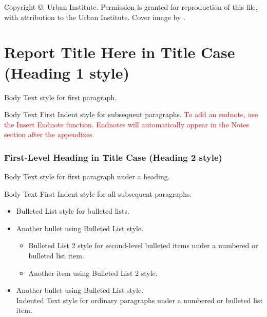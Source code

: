 \documentclass{urban-formatting}
\begin{document}
\vspace*{\fill}
\begin{singlespace}
    \noindent Copyright ©. Urban Institute. Permission is granted for reproduction of this file, with attribution to the Urban Institute. Cover image by .
\end{singlespace}

\cleardoublepage
\setcounter{page}{3}
\begin{singlespace}
    \tableofcontents
\end{singlespace}







\part{Report Title Here in Title Case (Heading 1 style)}

Body Text style for first paragraph.

Body Text First Indent style for subsequent paragraphs. \textcolor{red}{To add an endnote, use the Insert Endnote function. Endnotes will automatically appear in the Notes section after the appendixes.} 

\section{First-Level Heading in Title Case (Heading 2 style)}

Body Text style for first paragraph under a heading.

Body Text First Indent style for all subsequent paragraphs.
\begin{itemize}
    \item Bulleted List style for bulleted lists.
    \item Another bullet using Bulleted List style.
    \begin{itemize}
        \item Bulleted List 2 style for second-level bulleted items under a numbered or bulleted list item.
        \item Another item using Bulleted List 2 style.
    \end{itemize}
    \item Another bullet using Bulleted List style.\\
    Indented Text style for ordinary paragraphs under a numbered or bulleted list item.
\end{itemize}
\end{document}
